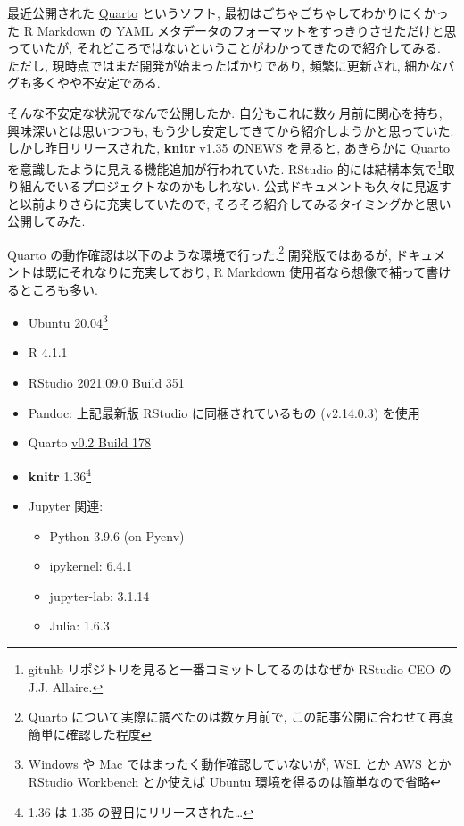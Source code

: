 \documentclass[
  letterpaper,
  DIV=11,
  pandoc,
  ja=standard,
  jafont=noto-otf]{bxjsarticle}
\providecommand{\tightlist}{%
  \setlength{\itemsep}{0pt}\setlength{\parskip}{0pt}}
\begin{document}
最近公開された \href{https://quarto.org/}{Quarto} というソフト,
最初はごちゃごちゃしてわかりにくかった R Markdown の YAML
メタデータのフォーマットをすっきりさせただけと思っていたが,
それどころではないということがわかってきたので紹介してみる. ただし,
現時点ではまだ開発が始まったばかりであり, 頻繁に更新され,
細かなバグも多くやや不安定である.

そんな不安定な状況でなんで公開したか. 自分もこれに数ヶ月前に関心を持ち,
興味深いとは思いつつも,
もう少し安定してきてから紹介しようかと思っていた.
しかし昨日リリースされた, \textbf{knitr} v1.35
の\href{https://github.com/yihui/knitr/blob/master/NEWS.md}{NEWS}
を見ると, あきらかに Quarto
を意識したように見える機能追加が行われていた. RStudio
的には結構本気で\footnote{gituhb
  リポジトリを見ると一番コミットしてるのはなぜか RStudio CEO の J.J.
  Allaire.}取り組んでいるプロジェクトなのかもしれない.
公式ドキュメントも久々に見返すと以前よりさらに充実していたので,
そろそろ紹介してみるタイミングかと思い公開してみた.

Quarto の動作確認は以下のような環境で行った.\footnote{Quarto
  について実際に調べたのは数ヶ月前で,
  この記事公開に合わせて再度簡単に確認した程度} 開発版ではあるが,
ドキュメントは既にそれなりに充実しており, R Markdown
使用者なら想像で補って書けるところも多い.

\begin{itemize}
\tightlist
\item
  Ubuntu 20.04\footnote{Windows や Mac ではまったく動作確認していないが,
    WSL とか AWS とか RStudio Workbench とか使えば Ubuntu
    環境を得るのは簡単なので省略}
\item
  R 4.1.1
\item
  RStudio 2021.09.0 Build 351
\item
  Pandoc: 上記最新版 RStudio に同梱されているもの (v2.14.0.3) を使用
\item
  Quarto
  \href{https://github.com/quarto-dev/quarto-cli/releases/tag/v0.2.178}{v0.2
  Build 178}
\item
  \textbf{knitr} 1.36\footnote{1.36 は 1.35
    の翌日にリリースされた\ldots{}}
\item
  Jupyter 関連:

  \begin{itemize}
  \tightlist
  \item
    Python 3.9.6 (on Pyenv)
  \item
    ipykernel: 6.4.1
  \item
    jupyter-lab: 3.1.14
  \item
    Julia: 1.6.3
  \end{itemize}
\end{itemize}
\end{document}
